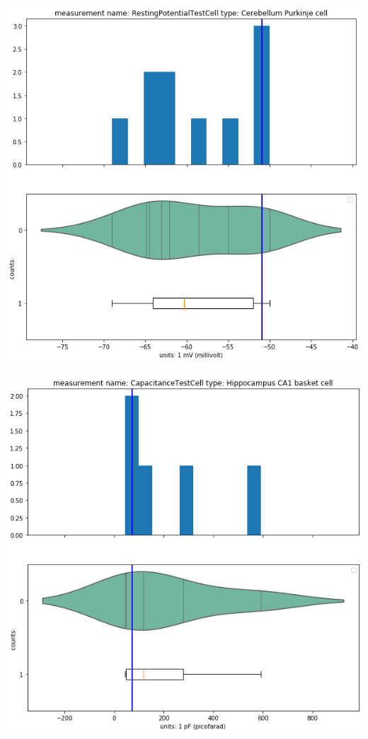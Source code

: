     \begin{center}
    \includegraphics[width=0.7\linewidth]{notebooks_converted/needata_thesis_files/needata_thesis_5_3}
    \end{center}

    \begin{center}
    \includegraphics[width=0.7\linewidth]{notebooks_converted/needata_thesis_files/needata_thesis_5_4}
    \end{center}

